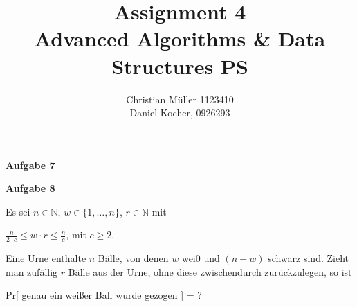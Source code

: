 \documentclass{article}
\begin{document}
\title{Assignment 4 \\ Advanced Algorithms \& Data Structures PS}%
\author{Christian Müller 1123410 \\ Daniel Kocher, 0926293}%
\maketitle

{\noindent\bfseries Aufgabe 7}%
\medskip%
 
\newpage
{\noindent\bfseries Aufgabe 8}%
\medskip%

Es sei $n \in \mathbb{N}$, $w \in \{ 1, \ldots, n \}$, $r \in \mathbb{N}$ mit
\begin{center}
  $\frac{n}{2 \cdot c} \leq w \cdot r \leq \frac{n}{c}$, mit $c \geq 2$.
\end{center}
Eine Urne enthalte $n$ B{\"a}lle, von denen $w$ wei0 und $(n - w)$ schwarz sind.
Zieht man zuf{\"a}llig $r$ B{\"a}lle aus der Urne, ohne diese zwischendurch
zur{\"u}ckzulegen, so ist
\begin{center}
  Pr[ genau ein wei{\ss}er Ball wurde gezogen ] = ?
\end{center}
\end{document}

